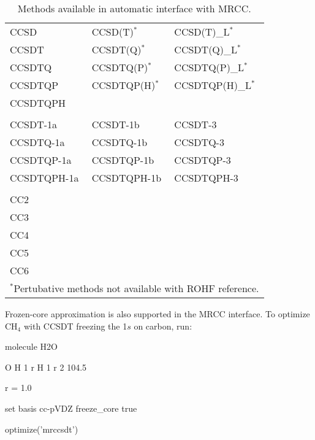 \begin{table}
\caption{Methods available in automatic interface with MRCC.}
\label{table:mrccauto}
\begin{center}
\small
\begin{tabular}{lll} \hline\hline
CCSD        & CCSD(T)$^*$      & CCSD(T)\_L$^*$    \\
CCSDT       & CCSDT(Q)$^*$     & CCSDT(Q)\_L$^*$   \\
CCSDTQ      & CCSDTQ(P)$^*$    & CCSDTQ(P)\_L$^*$  \\
CCSDTQP     & CCSDTQP(H)$^*$   & CCSDTQP(H)\_L$^*$ \\
CCSDTQPH    &                  &                   \\
            &                  &                   \\
CCSDT-1a    & CCSDT-1b         & CCSDT-3           \\
CCSDTQ-1a   & CCSDTQ-1b        & CCSDTQ-3          \\
CCSDTQP-1a  & CCSDTQP-1b       & CCSDTQP-3         \\
CCSDTQPH-1a & CCSDTQPH-1b      & CCSDTQPH-3        \\
            &                  &                   \\
CC2         &                  &                   \\
CC3         &                  &                   \\
CC4         &                  &                   \\
CC5         &                  &                   \\
CC6         &                  &                   \\
\hline\hline
\multicolumn{3}{l}{
\footnotesize{$^*$Pertubative methods not available with ROHF reference.}
}
\end{tabular}
\end{center}
\end{table}

Frozen-core approximation is also supported in the MRCC interface.
To optimize CH$_4$ with CCSDT freezing the 1$s$ on carbon, run:

\begin{Snippet}
molecule H2O {
    O
    H 1 r
    H 1 r 2 104.5

    r = 1.0
}

set {
    basis cc-pVDZ
    freeze_core true
}

optimize('mrccsdt')
\end{Snippet}

